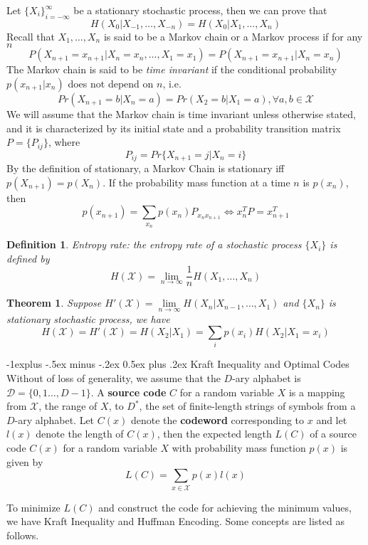\documentclass[10pt,landscape, a4paper]{article}
\makeatletter
\newtheorem{definition}{Definition}
\newtheorem{theorem}{Theorem}
\renewcommand{\subsection}{\@startsection{subsection}{2}{0mm}%
                                {-1explus -.5ex minus -.2ex}%
                                {0.5ex plus .2ex}%
                                {\normalfont\normalsize\bfseries}}
\makeatother
\begin{document}
\begin{multicols}{3}
Let $\{X_i\}_{i=-\infty}^\infty$ be a stationary stochastic process, then we can prove that
$$
H(X_0|X_{-1},\dots, X_{-n})=H(X_0|X_1,\dots, X_n)
$$
Recall that $X_1,\dots, X_n$ is said to be a Markov chain or a Markov process if for any $n$
$$
P(X_{n+1}=x_{n+1}|X_n=x_n,\dots, X_1=x_1)=P(X_{n+1}=x_{n+1}|X_n=x_n)
$$
The Markov chain is said to be \textit{time invariant} if the conditional probability $p(x_{n+1}|x_n)$ does not depend on $n$, i.e.
$$
Pr(X_{n+1}=b|X_n=a)=Pr(X_2=b|X_1=a),\forall a,b\in\mathcal{X}
$$
We will assume that the Markov chain is time invariant unless otherwise stated, and it is characterized by its initial state and a probability transition matrix $P=\{P_{ij}\}$, where
$$
P_{ij}=Pr\{X_{n+1}=j|X_n=i\}
$$
By the definition of stationary, a Markov Chain is stationary iff $p(X_{n+1})=p(X_n)$. If the probability mass function at a time $n$ is $p(x_n)$, then
$$
p(x_{n+1})=\sum_{x_n}p(x_n)P_{x_nx_{n+1}}\Leftrightarrow x_n^TP=x_{n+1}^T
$$
\begin{definition}
    Entropy rate: the entropy rate of a stochastic process $\{X_i\}$ is defined by
    $$
    H(\mathcal{X})=\lim_{n\rightarrow \infty}\frac{1}{n}H(X_1,\dots, X_n)
    $$
\end{definition}
\begin{theorem}
    Suppose $H'(\mathcal{X})=\lim\limits_{n\rightarrow \infty}H(X_n|X_{n-1},\dots, X_1)$ and $\{X_n\}$ is stationary stochastic process, we have
    $$
        H(\mathcal{X})=H'(\mathcal{X})=H(X_2|X_1)=\sum_i p(x_i)H(X_2|X_1=x_i)
    $$
\end{theorem}

\subsection{Kraft Inequality and Optimal Codes}
Without of loss of generality, we assume that the $D$-ary alphabet is $\mathcal{D}=\{0,1\dots, D-1\}$. A \textbf{source code} $C$ for a random variable $X$ is a mapping from $\mathcal{X}$, the range of $X$, to $D^*$, the set of finite-length strings of symbols from a $D$-ary alphabet. Let $C(x)$ denote the \textbf{codeword} corresponding to $x$ and let $l(x)$ denote the length of $C(x)$, then the expected length $L(C)$ of a source code $C(x)$ for a random variable $X$ with probability mass function $p(x)$ is given by
$$
L(C)=\sum_{x\in\mathcal{X}}p(x)l(x)
$$

To minimize $L(C)$ and construct the code for achieving the minimum values, we have Kraft Inequality and Huffman Encoding. Some concepts are listed as follows.


\end{multicols}
\end{document}
